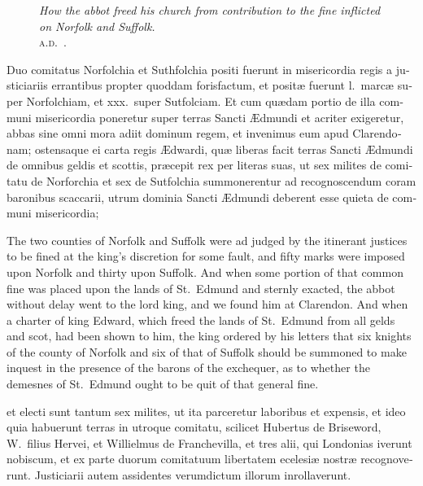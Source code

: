 \documentclass{book}
\newcommand{\blockhead}[4][]{
\begin{figure}
\centering
\vspace{#4}
\parbox{2.75cm}{\begin{center}\footnotesize \color{BrickRed} \emph{#2}\\ #1 \end{center}}
\end{figure}
}
\begin{document}
\begin{paracol}{2}
\switchcolumn*

\begin{otherlanguage}{latin}
\blockhead[\textsc{a.d}.\ .]{How the abbot freed his church from contribution to the fine inflicted on Norfolk and Suffolk.}{5}{-.6cm}
Duo comitatus Norfolchia et Suthfolchia positi fuerunt in misericordia regis a justiciariis errantibus propter quoddam forisfactum, et posit\ae{} fuerunt l.\ marc\ae{} super Norfolchiam, et xxx.\ super Sutfolciam. Et cum qu\ae{}dam portio de illa communi misericordia poneretur super terras Sancti \AE{}dmundi et acriter  exigeretur, abbas sine omni mora adiit dominum regem, et invenimus eum apud Clarendonam; ostensaque ei carta regis \AE{}dwardi, qu\ae{} liberas facit terras  Sancti \AE{}dmundi de omnibus geldis et scottis, pr\ae{}cepit rex per literas suas, ut sex milites de comitatu de Norforchia et sex de Sutfolchia summonerentur ad recognoscendum coram baronibus scaccarii, utrum dominia Sancti \AE{}dmundi deberent esse quieta de communi misericordia; 

\end{otherlanguage}

\switchcolumn

The two counties of Norfolk and Suffolk were ad judged by the itinerant justices to be fined at the king's discretion for some fault, and fifty marks were imposed upon Norfolk and thirty upon Suffolk. And when some portion of that common fine was placed upon the lands of St.\ Edmund and sternly exacted, the abbot without delay went to the lord king, and we found him at Clarendon. And when a charter of king Edward, which freed the lands of St.\ Edmund from all gelds and scot, had been shown to him, the king ordered by his letters that six knights of the county of Norfolk and six of that of Suffolk should be summoned to make inquest in the presence of the barons of the exchequer, as to whether the demesnes of St.\ Edmund ought to be quit of that general fine.

\switchcolumn*

\begin{otherlanguage}{latin}
et electi sunt tantum sex milites, ut ita parceretur laboribus et expensis, et ideo quia habuerunt terras in utroque comitatu, scilicet Hubertus de Briseword, W.\ filius Hervei, et Willielmus de Franchevilla, et tres alii, qui Londonias iverunt nobiscum, et ex parte duorum comitatuum libertatem ecelesi\ae{} nostr\ae{} recognoverunt. Justiciarii autem assidentes verumdictum illorum inrollaverunt.
\end{otherlanguage}


\end{paracol}
\end{document}

